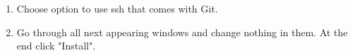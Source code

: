 \documentclass[a4paper,12pt]{book}
\begin{document}
\begin{enumerate}
\begin{minipage}[t]{\linewidth}
		\raggedright
		\medskip	
	\end{minipage}
	\item \begin{minipage}[t]{\linewidth}
		\raggedright
		\medskip	
	\end{minipage}
	Choose option to use ssh that comes with Git.
	\item Go through all next appearing windows and change nothing in them. At the end click "Install".
\end{enumerate}
\pagebreak
\end{document}
